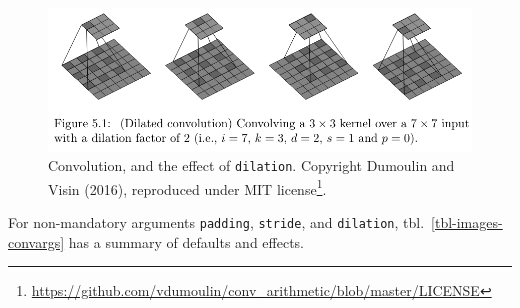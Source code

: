 \documentclass[
  letterpaper,
]{krantz}
\DeclareRobustCommand{\href}[2]{#2\footnote{\url{#1}}}
\begin{document}
\begin{figure}[H]

{\centering \includegraphics{images/images-conv-arithmetic-dilation.png}

}

\caption{\label{fig-images-conv-arithmetic-dilation}Convolution, and the
effect of \texttt{dilation}. Copyright Dumoulin and Visin (2016),
reproduced under
\href{https://github.com/vdumoulin/conv_arithmetic/blob/master/LICENSE}{MIT
license}.}

\end{figure}

For non-mandatory arguments \texttt{padding}, \texttt{stride}, and
\texttt{dilation}, tbl.~\ref{tbl-images-convargs} has a summary of
defaults and effects.
\end{document}
